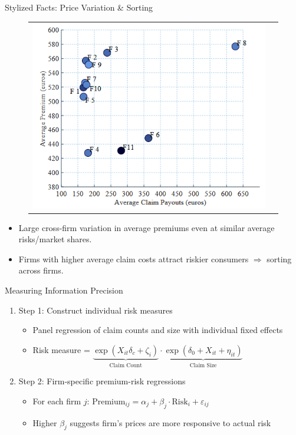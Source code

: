 \documentclass[10pt,aspectratio=169]{beamer}
\begin{document}
\begin{frame}{Stylized Facts: Price Variation \& Sorting}
\begin{figure}[H]
\centering{}%
\begin{tabular}{cc}
\includegraphics[scale=0.47]{Figures/Fig1.png}
\end{tabular}
\end{figure}
\vspace{0.75em}
\begin{itemize}
  \item Large cross-firm variation in average premiums even at similar average risks/market shares.
  \item Firms with higher average claim costs attract riskier consumers $\Rightarrow$ sorting across firms.
\end{itemize}
\end{frame}

\begin{frame}{Measuring Information Precision}
\begin{enumerate}
\item Step 1: Construct individual risk measures
\begin{itemize}
\item Panel regression of claim counts and size  with individual fixed effects
\item Risk measure = $ \underbrace{\exp(X_{it}\delta_c + \zeta_i)}_{\text{Claim Count}} \cdot  \underbrace{\exp(\delta_0 + X_{it}+ \eta_{it})}_{\text{Claim Size}}$
\end{itemize}
\item Step 2: Firm-specific premium-risk regressions
\begin{itemize}
\item For each firm $j$: $\text{Premium}_{ij} = \alpha_j + \beta_j \cdot \text{Risk}_i + \varepsilon_{ij}$
\item Higher $\beta_j$ suggests firm's prices are more responsive to actual risk
\end{itemize}
\end{enumerate}
\end{frame}
\end{document}
